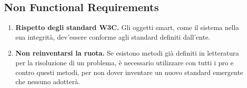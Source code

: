 \documentclass[12pt,a4paper,openright,oneside]{report}
\begin{document}
\subsection{Non Functional Requirements}
\begin{enumerate}[label*=\arabic*.]
	\item \textbf{Rispetto degli standard W3C.} Gli oggetti smart, come il sistema nella sua integrità, dev'essere conforme agli standard definiti dall'ente.
	
	\item \textbf{Non reinventarsi la ruota.} Se esistono metodi già definiti in letteratura per la risoluzione di un problema, è necessario utilizzare con tutti i pro e contro questi metodi, per non dover inventare un nuovo standard emergente che nessuno adotterà.
\end{enumerate}
\end{document}
